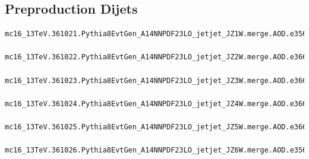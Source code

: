 \subsection{Preproduction Dijets}

\begin{lstlisting}[basicstyle=\small\ttfamily, breaklines=true]
  mc16_13TeV.361021.Pythia8EvtGen_A14NNPDF23LO_jetjet_JZ1W.merge.AOD.e3569_s2997_r9064_r8996
  mc16_13TeV.361022.Pythia8EvtGen_A14NNPDF23LO_jetjet_JZ2W.merge.AOD.e3668_s2997_r9064_r9078
  mc16_13TeV.361023.Pythia8EvtGen_A14NNPDF23LO_jetjet_JZ3W.merge.AOD.e3668_s2997_r9064_r8996
  mc16_13TeV.361024.Pythia8EvtGen_A14NNPDF23LO_jetjet_JZ4W.merge.AOD.e3668_s2997_r9064_r9078
  mc16_13TeV.361025.Pythia8EvtGen_A14NNPDF23LO_jetjet_JZ5W.merge.AOD.e3668_s2997_r9064_r8996
  mc16_13TeV.361026.Pythia8EvtGen_A14NNPDF23LO_jetjet_JZ6W.merge.AOD.e3569_s2997_r9064_r9078
\end{lstlisting}

